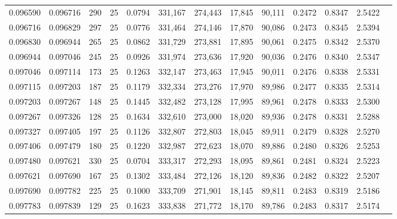 \begin{tabular}{rrrrrrrrrrrrr}
0.096590 & 0.096716 &   290 &  25 &                                     0.0794 & 331,167 & 274,443 &  17,845 &  90,111 & 0.2472 & 0.8347 & 2.5422 \\
0.096716 & 0.096829 &   297 &  25 &                                     0.0776 & 331,464 & 274,146 &  17,870 &  90,086 & 0.2473 & 0.8345 & 2.5394 \\
0.096830 & 0.096944 &   265 &  25 &                                     0.0862 & 331,729 & 273,881 &  17,895 &  90,061 & 0.2475 & 0.8342 & 2.5370 \\
0.096944 & 0.097046 &   245 &  25 &                                     0.0926 & 331,974 & 273,636 &  17,920 &  90,036 & 0.2476 & 0.8340 & 2.5347 \\
0.097046 & 0.097114 &   173 &  25 &                                     0.1263 & 332,147 & 273,463 &  17,945 &  90,011 & 0.2476 & 0.8338 & 2.5331 \\
0.097115 & 0.097203 &   187 &  25 &                                     0.1179 & 332,334 & 273,276 &  17,970 &  89,986 & 0.2477 & 0.8335 & 2.5314 \\
0.097203 & 0.097267 &   148 &  25 &                                     0.1445 & 332,482 & 273,128 &  17,995 &  89,961 & 0.2478 & 0.8333 & 2.5300 \\
0.097267 & 0.097326 &   128 &  25 &                                     0.1634 & 332,610 & 273,000 &  18,020 &  89,936 & 0.2478 & 0.8331 & 2.5288 \\
0.097327 & 0.097405 &   197 &  25 &                                     0.1126 & 332,807 & 272,803 &  18,045 &  89,911 & 0.2479 & 0.8328 & 2.5270 \\
0.097406 & 0.097479 &   180 &  25 &                                     0.1220 & 332,987 & 272,623 &  18,070 &  89,886 & 0.2480 & 0.8326 & 2.5253 \\
0.097480 & 0.097621 &   330 &  25 &                                     0.0704 & 333,317 & 272,293 &  18,095 &  89,861 & 0.2481 & 0.8324 & 2.5223 \\
0.097621 & 0.097690 &   167 &  25 &                                     0.1302 & 333,484 & 272,126 &  18,120 &  89,836 & 0.2482 & 0.8322 & 2.5207 \\
0.097690 & 0.097782 &   225 &  25 &                                     0.1000 & 333,709 & 271,901 &  18,145 &  89,811 & 0.2483 & 0.8319 & 2.5186 \\
0.097783 & 0.097839 &   129 &  25 &                                     0.1623 & 333,838 & 271,772 &  18,170 &  89,786 & 0.2483 & 0.8317 & 2.5174 \\

\end{tabular}
